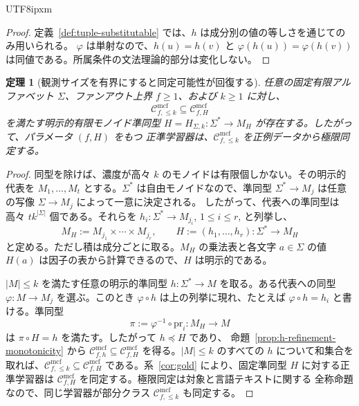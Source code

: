 \documentclass[10pt,a4paper]{article}
\newtheorem{theorem}{定理}[section]
\theoremstyle{remark}
\newcommand{\Cmcf}[2]{\mathcal{C}^{\mathrm{mcf}}_{#1,#2}}
\begin{document}
\begin{CJK}{UTF8}{ipxm}
\begin{proof}
定義~\ref{def:tuple-substitutable} では、\(h\) は成分別の値の等しさを通じてのみ用いられる。
\(\varphi\) は単射なので、\(h(u)=h(v)\) と
\(\varphi(h(u))=\varphi(h(v))\) は同値である。所属条件の文法理論的部分は変化しない。
\end{proof}

\begin{theorem}[観測サイズを有界にすると同定可能性が回復する]
\label{thm:bounded-union-identifiable}
任意の固定有限アルファベット \(\Sigma\)、ファンアウト上界 \(f\ge1\)、および \(k\ge1\) に対し、
\[
  \Cmcf{f}{\le k}\subseteq\Cmcf{f}{H}
\]
を満たす明示的有限モノイド準同型
\(H=H_{\Sigma,k}:\Sigma^*\to M_H\) が存在する。したがって、パラメータ \((f,H)\) をもつ
正準学習器は、\(\Cmcf{f}{\le k}\) を正例データから極限同定する。
\end{theorem}

\begin{proof}
同型を除けば、濃度が高々 \(k\) のモノイドは有限個しかない。その明示的代表を
\(M_1,\ldots,M_t\) とする。\(\Sigma^*\) は自由モノイドなので、準同型
\(\Sigma^*\to M_j\) は任意の写像 \(\Sigma\to M_j\) によって一意に決定される。
したがって、代表への準同型は高々 \(t k^{|\Sigma|}\) 個である。それらを
\(h_i:\Sigma^*\to M_{j_i}\), \(1\le i\le r\), と列挙し、
\[
  M_H:=M_{j_1}\times\cdots\times M_{j_r},
  \qquad
  H:=(h_1,\ldots,h_r):\Sigma^*\to M_H
\]
と定める。ただし積は成分ごとに取る。\(M_H\) の乗法表と各文字 \(a\in\Sigma\) の値
\(H(a)\) は因子の表から計算できるので、\(H\) は明示的である。

\(|M|\le k\) を満たす任意の明示的準同型 \(h:\Sigma^*\to M\) を取る。ある代表への同型
\(\varphi:M\to M_j\) を選ぶ。このとき \(\varphi\circ h\) は上の列挙に現れ、たとえば
\(\varphi\circ h=h_i\) と書ける。準同型
\[
  \pi:=\varphi^{-1}\circ\mathrm{pr}_i:M_H\to M
\]
は \(\pi\circ H=h\) を満たす。したがって \(h\preceq H\) であり、
命題~\ref{prop:h-refinement-monotonicity} から
\(\Cmcf{f}{h}\subseteq\Cmcf{f}{H}\) を得る。\(|M|\le k\) のすべての \(h\) について和集合を
取れば、\(\Cmcf{f}{\le k}\subseteq\Cmcf{f}{H}\) である。系~\ref{cor:gold} により、固定準同型
\(H\) に対する正準学習器は \(\Cmcf{f}{H}\) を同定する。極限同定は対象と言語テキストに関する
全称命題なので、同じ学習器が部分クラス \(\Cmcf{f}{\le k}\) も同定する。
\end{proof}


\end{CJK}
\end{document}

